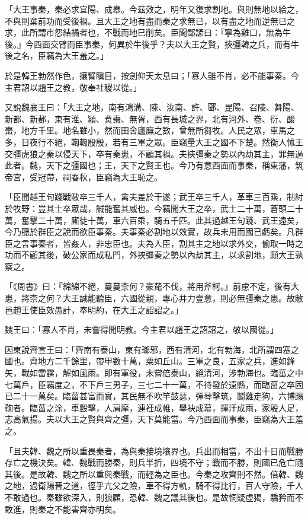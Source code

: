 \begin{pinyinscope}
「大王事秦，秦必求宜陽、成皋。今茲效之，明年又復求割地。與則無地以給之，不與則棄前功而受後禍。且大王之地有盡而秦之求無已，以有盡之地而逆無已之求，此所謂市怨結禍者也，不戰而地已削矣。臣聞鄙諺曰：『寧為雞口，無為牛後。』今西面交臂而臣事秦，何異於牛後乎？夫以大王之賢，挾彊韓之兵，而有牛後之名，臣竊為大王羞之。」

於是韓王勃然作色，攘臂瞋目，按劍仰天太息曰；「寡人雖不肖，必不能事秦。今主君詔以趙王之教，敬奉社稷以從。」

又說魏襄王曰：「大王之地，南有鴻溝、陳、汝南、許、郾、昆陽、召陵、舞陽、新都、新郪，東有淮、潁、煑棗、無胥，西有長城之界，北有河外、卷、衍、酸棗，地方千里。地名雖小，然而田舍廬廡之數，曾無所芻牧。人民之眾，車馬之多，日夜行不絕，輷輷殷殷，若有三軍之眾。臣竊量大王之國不下楚。然衡人怵王交彊虎狼之秦以侵天下，卒有秦患，不顧其禍。夫挾彊秦之勢以內劫其主，罪無過此者。魏，天下之彊國也；王，天下之賢王也。今乃有意西面而事秦，稱東藩，筑帝宮，受冠帶，祠春秋，臣竊為大王恥之。

「臣聞越王句踐戰敝卒三千人，禽夫差於干遂；武王卒三千人，革車三百乘，制紂於牧野：豈其士卒眾哉，誠能奮其威也。今竊聞大王之卒，武士二十萬，蒼頭二十萬，奮擊二十萬，廝徒十萬，車六百乘，騎五千匹。此其過越王句踐、武王遠矣，今乃聽於群臣之說而欲臣事秦。夫事秦必割地以效實，故兵未用而國已虧矣。凡群臣之言事秦者，皆姦人，非忠臣也。夫為人臣，割其主之地以求外交，偷取一時之功而不顧其後，破公家而成私門，外挾彊秦之勢以內劫其主，以求割地，願大王孰察之。

「《周書》曰：『綿綿不絕，蔓蔓柰何？豪氂不伐，將用斧柯。』前慮不定，後有大患，將柰之何？大王誠能聽臣，六國從親，專心并力壹意，則必無彊秦之患。故敝邑趙王使臣效愚計，奉明約，在大王之詔詔之。」

魏王曰：「寡人不肖，未嘗得聞明教。今主君以趙王之詔詔之，敬以國從。」

因東說齊宣王曰：「齊南有泰山，東有瑯邪，西有清河，北有勃海，北所謂四塞之國也。齊地方二千餘里，帶甲數十萬，粟如丘山。三軍之良，五家之兵，進如鋒矢，戰如雷霆，解如風雨。即有軍役，未嘗倍泰山，絕清河，涉勃海也。臨菑之中七萬戶，臣竊度之，不下戶三男子，三七二十一萬，不待發於遠縣，而臨菑之卒固已二十一萬矣。臨菑甚富而實，其民無不吹竽鼓瑟，彈琴擊筑，鬬雞走狗，六博蹋鞠者。臨菑之涂，車轂擊，人肩摩，連衽成帷，舉袂成幕，揮汗成雨，家殷人足，志高氣揚。夫以大王之賢與齊之彊，天下莫能當。今乃西面而事秦，臣竊為大王羞之。

「且夫韓、魏之所以重畏秦者，為與秦接境壤界也。兵出而相當，不出十日而戰勝存亡之機決矣。韓、魏戰而勝秦，則兵半折，四境不守；戰而不勝，則國已危亡隨其後。是故韓、魏之所以重與秦戰，而輕為之臣也。今秦之攻齊則不然。倍韓、魏之地，過衛陽晉之道，徑乎亢父之險，車不得方軌，騎不得比行，百人守險，千人不敢過也。秦雖欲深入，則狼顧，恐韓、魏之議其後也。是故恫疑虛猲，驕矜而不敢進，則秦之不能害齊亦明矣。


\end{pinyinscope}
